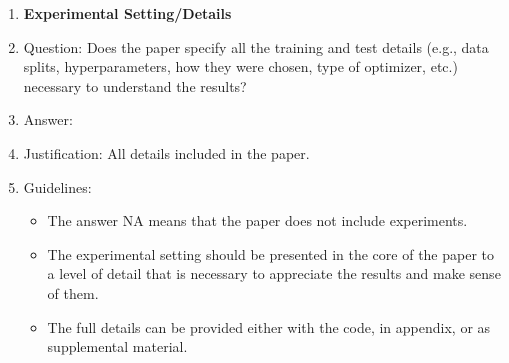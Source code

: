 \documentclass{article}
\begin{document}
\begin{enumerate}
\item {\bf Experimental Setting/Details}
    \item[] Question: Does the paper specify all the training and test details (e.g., data splits, hyperparameters, how they were chosen, type of optimizer, etc.) necessary to understand the results?
    \item[] Answer: \answerYes{} %
    \item[] Justification: All details included in the paper.
    \item[] Guidelines:
    \begin{itemize}
        \item The answer NA means that the paper does not include experiments.
        \item The experimental setting should be presented in the core of the paper to a level of detail that is necessary to appreciate the results and make sense of them.
        \item The full details can be provided either with the code, in appendix, or as supplemental material.
    \end{itemize}


\end{enumerate}
\end{document}
